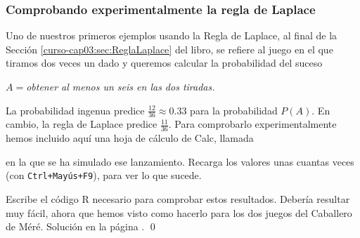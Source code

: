 \documentclass[10pt,a4paper]{article}\usepackage[]{graphicx}\usepackage[]{color}
\begin{document}
                                                                                                                                                            
                                                                                                                                                            \subsubsection{Comprobando experimentalmente la regla de Laplace}
                                                                                                                                                            \label{tut03:subsubsec:ComprobandoExperimentalmenteReglaLaplace}
                                                                                                                                                            
                                                                                                                                                            Uno de nuestros primeros ejemplos usando la Regla de Laplace, al final de la Sección \ref{curso-cap03:sec:ReglaLaplace} del libro, se refiere al juego en el que tiramos dos veces un dado y queremos calcular la probabilidad del suceso
                                                                                                                                                            \begin{center}
{\sf  $A=${\em obtener al menos un seis en las dos tiradas.} }
\end{center}
La probabilidad ingenua predice $\frac{12}{36}\approx 0.33$ para la probabilidad $P(A)$. En cambio, la regla de Laplace predice $\frac{11}{36}$. Para comprobarlo experimentalmente hemos incluido aquí una hoja de cálculo de Calc, llamada
\begin{center}
\end{center}
en la que se ha simulado ese lanzamiento. Recarga los valores unas cuantas
veces (con {\tt Ctrl+Mayús+F9}), para ver lo que sucede.

\begin{ejercicio}
\label{tut03:ejercicio12}
\quad
Escribe el código R necesario para comprobar estos resultados. Debería resultar muy fácil, ahora que hemos visto como hacerlo para los dos juegos del Caballero de Méré.
Solución en la página \pageref{tut03:ejercicio12:sol}.
\qed
\end{ejercicio}
\end{document}
